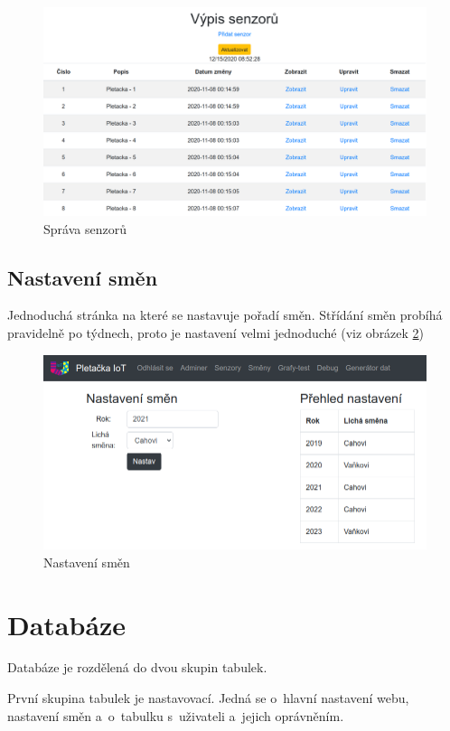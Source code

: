 \begin{figure}[htbp]
    \centering
    \includegraphics[width=\textwidth]{img/Edit.png}
    \caption{Správa senzorů}
    \label{fig:webSpravaSenzoru}
\end{figure}

\subsection{Nastavení směn}
Jednoduchá stránka na které se nastavuje pořadí směn.
Střídání směn probíhá pravidelně po týdnech, proto je nastavení velmi jednoduché (viz obrázek \ref{fig:webSmeny})

\begin{figure}[htbp]
    \centering
    \includegraphics[width=\textwidth]{img/smeny.png}
    \caption{Nastavení směn}
    \label{fig:webSmeny}
\end{figure}

\section{Databáze}
Databáze je rozdělená do dvou skupin tabulek.

První skupina tabulek je nastavovací.
Jedná se o~hlavní nastavení webu, nastavení směn a~o~tabulku s~uživateli a~jejich oprávněním.

